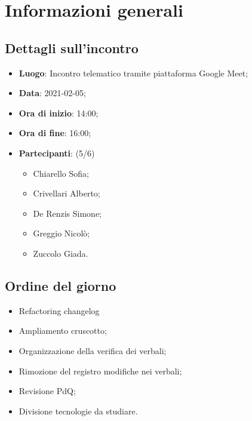 \section{Informazioni generali}

\subsection{Dettagli sull'incontro}
\begin{itemize}
\item \textbf{Luogo}: Incontro telematico tramite piattaforma Google Meet;
\item \textbf{Data}: 2021-02-05;
\item \textbf{Ora di inizio}: 14:00;
\item \textbf{Ora di fine}: 16:00;
\item \textbf{Partecipanti}: (5/6)
\begin{itemize}
	\item Chiarello Sofia;
    \item Crivellari Alberto;
    \item De Renzis Simone;
    \item Greggio Nicolò;
    \item Zuccolo Giada.
\end{itemize}
\end{itemize}

\subsection{Ordine del giorno}
\begin{itemize}
	\item Refactoring changelog
	\item Ampliamento cruscotto;
	\item Organizzazione della verifica dei verbali;
	\item Rimozione del registro modifiche nei verbali;
	\item Revisione PdQ;
	\item Divisione tecnologie da studiare.
\end{itemize}


